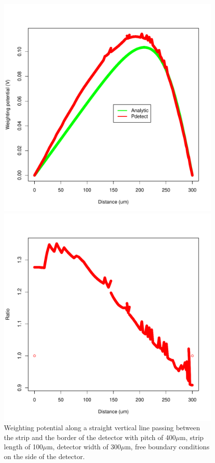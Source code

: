 \documentclass[11pt]{article}
\begin{document}
	\begin{figure}[H]
		\begin{minipage}[b]{.46\linewidth}
			\center
			\includegraphics[scale=0.5]{images/annexe/middle-pitch.pdf}
			\caption{Weighting potential along a straight vertical line passing between the strip and
					the border of the detector with pitch
					of 400$\mu$m, strip length of 100$\mu$m, detector width of 300$\mu$m, free boundary conditions
					on the side of the detector.}
			\label{fig:mid_pitch}
		\end{minipage} \hfill
		\begin{minipage}[b]{.46\linewidth}
			\center
			\includegraphics[scale=0.5]{images/annexe/middle-pitch_ratio.pdf}

\end{minipage}
\end{figure}
\end{document}
